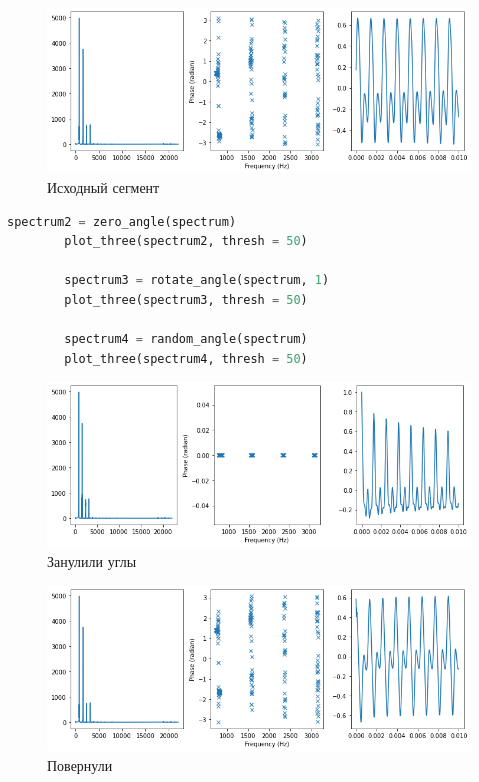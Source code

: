 \documentclass[a4paper, 12pt]{report}
\begin{document}
	\begin{figure}[H]
		\centering
		\includegraphics[width=1.0\textwidth]{test8.png}
		\caption{Исходный сегмент}
		\label{fig:test8}
	\end{figure}
	\begin{lstlisting}[language=Python,caption=Применение функций]
		spectrum2 = zero_angle(spectrum)
		plot_three(spectrum2, thresh = 50)
		
		spectrum3 = rotate_angle(spectrum, 1)
		plot_three(spectrum3, thresh = 50)

		spectrum4 = random_angle(spectrum)
		plot_three(spectrum4, thresh = 50)
	\end{lstlisting}
	\begin{figure}[H]
		\centering
		\includegraphics[width=1.0\textwidth]{test9.png}
		\caption{Занулили углы}
		\label{fig:test9}
	\end{figure}
	\begin{figure}[H]
		\centering
		\includegraphics[width=1.0\textwidth]{test10.png}
		\caption{Повернули}
		\label{fig:test10}
	\end{figure}
\end{document}
